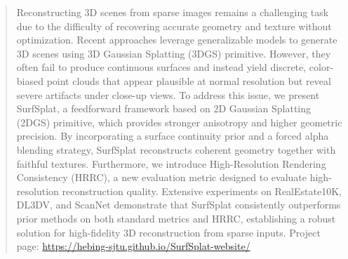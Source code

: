 \begin{abstract}
Reconstructing 3D scenes from sparse images remains a challenging task due to the difficulty of recovering accurate geometry and texture without optimization.
Recent approaches leverage generalizable models to generate 3D scenes using 3D Gaussian Splatting (3DGS) primitive. 
However, they often fail to produce continuous surfaces and instead yield discrete, color-biased point clouds that appear plausible at normal resolution but reveal severe artifacts under close-up views. 
To address this issue, we present SurfSplat, a feedforward framework based on 2D Gaussian Splatting (2DGS) primitive, which provides stronger anisotropy and higher geometric precision. By incorporating a surface continuity prior and a forced alpha blending strategy, SurfSplat reconstructs coherent geometry together with faithful textures.
Furthermore, we introduce High-Resolution Rendering Consistency (HRRC), a new evaluation metric designed to evaluate high-resolution reconstruction quality. Extensive experiments on RealEstate10K, DL3DV, and ScanNet demonstrate that SurfSplat consistently outperforms prior methods on both standard metrics and HRRC, establishing a robust solution for high-fidelity 3D reconstruction from sparse inputs. Project page: \url{https://hebing-sjtu.github.io/SurfSplat-website/}

\end{abstract}

